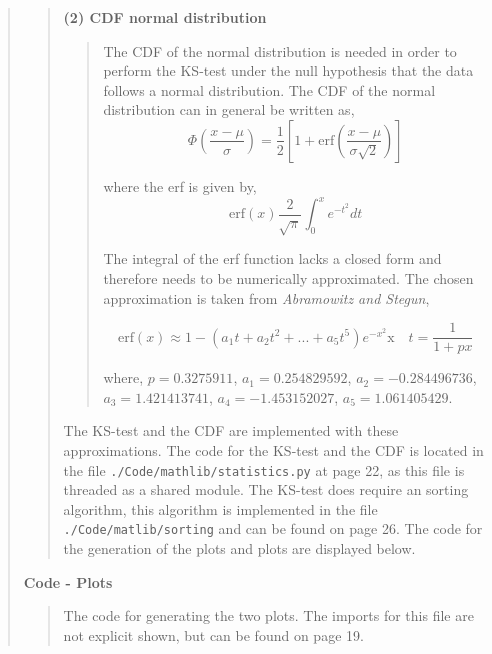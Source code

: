 \begin{quote}
\begin{quote}
\textbf{(2) CDF normal distribution}
\begin{quote}
The CDF of the normal distribution is needed in order to perform the KS-test under the null hypothesis that the data follows a normal distribution. The CDF of the normal distribution can in general be written as,
\begin{equation}
\Phi\left( \frac{x- \mu}{\sigma}\right) = \frac{1}{2} \left[ 1 + \text{erf} \left( \frac{x - \mu}{\sigma\sqrt{2}} \right) \right]
\end{equation}

where the erf is given by,
\begin{equation}
\text{erf}(x)  \frac{2}{\sqrt{\pi}} \int_0^{x} e^{-t^2} dt
\end{equation}

The integral of the erf function lacks a closed form and therefore needs to be numerically approximated. The chosen approximation is taken from \textit{Abramowitz and Stegun},

\begin{equation}
\text{erf}(x) \approx 1- (a_1t+a_2t^2 + ... + a_5t^5)e^{-x^2} \text{x} \quad t = \frac{1}{1+px}
\end{equation}

where, $p  =0.3275911$, $a_1 =  0.254829592$, $a_2 = -0.284496736$, $a_3 = 1.421413741$, $a_4 =  -1.453152027$, $a_5 = 1.061405429$.
\end{quote}

The KS-test and the CDF are implemented with these approximations. The code for the KS-test and the CDF  is located in the file \texttt{./Code/mathlib/statistics.py} at page 22, as this file is threaded as a shared module. The KS-test does require an sorting algorithm, this algorithm is implemented in the file \texttt{./Code/matlib/sorting} and can be found on page 26. 
 The code for the generation of the plots and plots are displayed below.  
\end{quote}

\newpage
\textbf{Code - Plots}

\begin{quote}
The code for generating the two plots. The imports for this file are not explicit shown, but can be found on page 19.

\end{quote}
\newpage


\end{quote}
